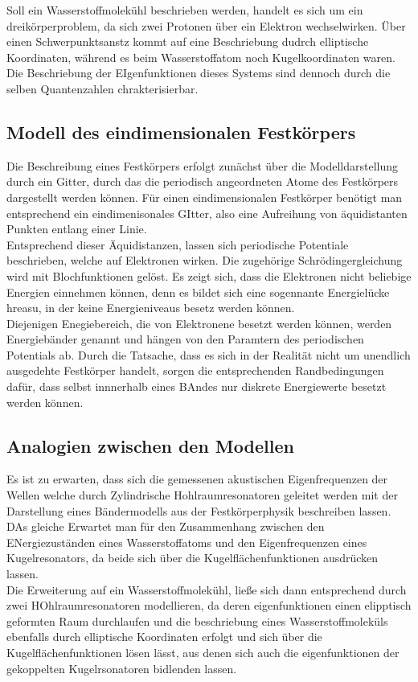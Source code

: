 Soll ein Wasserstoffmolekühl beschrieben werden, handelt es sich um ein dreikörperproblem,
da sich zwei Protonen über ein Elektron wechselwirken. Über einen Schwerpunktsanstz kommt 
auf eine Beschriebung dudrch elliptische Koordinaten, während es beim Wasserstoffatom noch 
Kugelkoordinaten waren. Die Beschriebung der EIgenfunktionen dieses Systems sind dennoch durch 
die selben Quantenzahlen chrakterisierbar.

\subsection{Modell des eindimensionalen Festkörpers}
Die Beschreibung eines Festkörpers erfolgt zunächst über die Modelldarstellung durch ein 
Gitter, durch das die periodisch angeordneten Atome des Festkörpers dargestellt werden können.
Für einen eindimensionalen Festkörper benötigt man entsprechend ein eindimenisonales GItter,
also eine Aufreihung von äquidistanten Punkten entlang einer Linie.\\

Entsprechend dieser Äquidistanzen, lassen sich periodische Potentiale beschrieben, 
welche auf Elektronen wirken. Die zugehörige Schrödingergleichung wird mit 
Blochfunktionen gelöst. Es zeigt sich, dass die Elektronen nicht beliebige Energien 
einnehmen können, denn es bildet sich eine sogennante Energielücke hreasu, in der 
keine Energieniveaus besetz werden können.\\

Diejenigen Enegiebereich, die von Elektronene besetzt werden können, werden Energiebänder 
genannt und hängen von den Paramtern des periodischen Potentials ab. Durch die 
Tatsache, dass es sich in der Realität nicht um unendlich ausgedehte Festkörper handelt, 
sorgen die entsprechenden Randbedingungen dafür, dass selbst innnerhalb eines BAndes 
nur diskrete Energiewerte besetzt werden können.\\

\subsection{Analogien zwischen den Modellen}
Es ist zu erwarten, dass sich die gemessenen akustischen Eigenfrequenzen der Wellen
welche durch Zylindrische Hohlraumresonatoren geleitet werden mit der Darstellung eines
Bändermodells aus der Festkörperphysik beschreiben lassen.\\
DAs gleiche Erwartet man für den Zusammenhang zwischen den ENergiezuständen eines 
Wasserstoffatoms und den Eigenfrequenzen eines Kugelresonators, da beide sich über die 
Kugelflächenfunktionen ausdrücken lassen.\\
Die Erweiterung auf ein Wasserstoffmolekühl, ließe sich dann entsprechend durch 
zwei HOhlraumresonatoren modellieren, da deren eigenfunktionen einen elipptisch 
geformten Raum durchlaufen und die beschriebung eines Wasserstoffmoleküls ebenfalls 
durch elliptische Koordinaten erfolgt und sich über die Kugelflächenfunktionen
lösen lässt, aus denen sich auch die eigenfunktionen der gekoppelten Kugelrsonatoren 
bidlenden lassen. 

\cite{sample}
